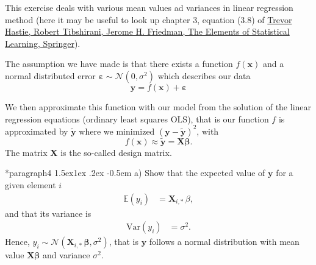 \documentclass[%
oneside,                 %
final,                   %
10pt]{article}
\makeatletter
\newenvironment{doconceexercise}{}{}
\newcounter{doconceexercisecounter}
\newcommand\subex{\@startsection*{paragraph}{4}{\z@}%
                  {1.5ex\@plus1ex \@minus.2ex}%
                  {-0.5em}%
                  {\normalfont\normalsize\bfseries}}
\makeatother
\begin{document}
\begin{doconceexercise}

                             

This exercise deals with various mean values ad variances in  linear regression method (here it may be useful to look up chapter 3, equation (3.8) of \href{{https://www.springer.com/gp/book/9780387848570}}{Trevor Hastie, Robert Tibshirani, Jerome H. Friedman, The Elements of Statistical Learning, Springer}).

The assumption we have made is 
that there exists a function $f(\bm{x})$ and  a normal distributed error $\bm{\varepsilon}\sim \mathcal{N}(0, \sigma^2)$
which describes our data
\[
\bm{y} = f(\bm{x})+\bm{\varepsilon}
\]

We then approximate this function with our model from the solution of the linear regression equations (ordinary least squares OLS), that is our
function $f$ is approximated by $\bm{\tilde{y}}$ where we minimized  $(\bm{y}-\bm{\tilde{y}})^2$, with
\[
f(\bm{x})\approx \bm{\tilde{y}} = \bm{X}\bm{\beta}.
\]
The matrix $\bm{X}$ is the so-called design matrix.

\subex{a)}
Show that  the expected value of $\bm{y}$ for a given element $i$ 
\begin{align*} 
\mathbb{E}(y_i) & =\mathbf{X}_{i, \ast} \, \beta, 
\end{align*} 
and that
its variance is 
\begin{align*} \mbox{Var}(y_i) & = \sigma^2.  
\end{align*}
Hence, $y_i \sim \mathcal{N}( \mathbf{X}_{i, \ast} \, \bm{\beta}, \sigma^2)$, that is $\bm{y}$ follows a normal distribution with 
mean value $\bm{X}\bm{\beta}$ and variance $\sigma^2$.


\end{doconceexercise}
\end{document}
